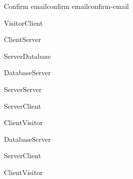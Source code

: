 \begin{sdfig}{Confirm email}{confirm email}{confirm-email}

	\begin{umlcall}[op={Confirm}]{Visitor}{Client}
		\begin{umlcall}[op={Confirm}]{Client}{Server}
			\begin{umlcall}[op={Has OTP}]{Server}{Database}
				\begin{umlfragment}[type=alt, label=true]
					\begin{umlcall}[type=return,op={Yes}]{Database}{Server}
						\begin{umlcall}[op={Add cookies}]{Server}{Server}
						\end{umlcall}
						\begin{umlcall}[type=return,op={Done}]{Server}{Client}
							\begin{umlcall}[type=return,op={Done}]{Client}{Visitor}
							\end{umlcall}
						\end{umlcall}
					\end{umlcall}
					\umlfpart[else]
					\begin{umlcall}[type=return,op={No}]{Database}{Server}
						\begin{umlcall}[type=return,op={Error}]{Server}{Client}
							\begin{umlcall}[type=return,op={Error}]{Client}{Visitor}
							\end{umlcall}
						\end{umlcall}
					\end{umlcall}
				\end{umlfragment}
			\end{umlcall}
		\end{umlcall}
	\end{umlcall}
\end{sdfig}



